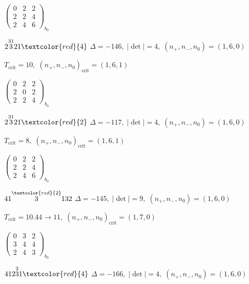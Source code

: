 \documentclass[10pt]{article}
\begin{document}
\hspace{2em}$\left(\begin{smallmatrix}0 & 2 & 2 \\ 2 & 2 & 4 \\ 2 & 4 & 6\end{smallmatrix}\right)_{\!b_0}$

\smallskip

$2\overset{31}{3}21\textcolor{red}{4}$ \quad $\Delta=-146,\; |\det|=4,\; (n_+,n_-,n_0)=(1,6,0)$

\hspace{1em}$T_{\text{crit}}=10,\; (n_+,n_-,n_0)_{\text{crit}}=(1,6,1)$

\hspace{2em}$\left(\begin{smallmatrix}0 & 2 & 2 \\ 2 & 0 & 2 \\ 2 & 2 & 4\end{smallmatrix}\right)_{\!b_0}$

$2\overset{31}{3}21\textcolor{red}{2}$ \quad $\Delta=-117,\; |\det|=4,\; (n_+,n_-,n_0)=(1,6,0)$

\hspace{1em}$T_{\text{crit}}=8,\; (n_+,n_-,n_0)_{\text{crit}}=(1,6,1)$

\hspace{2em}$\left(\begin{smallmatrix}0 & 2 & 2 \\ 2 & 2 & 4 \\ 2 & 4 & 6\end{smallmatrix}\right)_{\!b_0}$

\smallskip

$41\overset{\textcolor{red}{2}}{3}132$ \quad $\Delta=-145,\; |\det|=9,\; (n_+,n_-,n_0)=(1,6,0)$

\hspace{1em}$T_{\text{crit}}=10.44 \to 11,\; (n_+,n_-,n_0)_{\text{crit}}=(1,7,0)$

\hspace{2em}$\left(\begin{smallmatrix}0 & 3 & 2 \\ 3 & 4 & 4 \\ 2 & 4 & 3\end{smallmatrix}\right)_{\!b_0}$

\smallskip

$412\overset{2}{3}1\textcolor{red}{4}$ \quad $\Delta=-166,\; |\det|=4,\; (n_+,n_-,n_0)=(1,6,0)$
\end{document}
